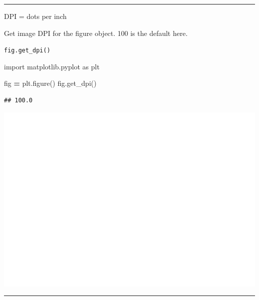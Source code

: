 \documentclass[
]{book}
\newenvironment{Shaded}{\begin{snugshade}}{\end{snugshade}}
\newcommand{\ImportTok}[1]{#1}
\newcommand{\NormalTok}[1]{#1}
\newcommand{\OperatorTok}[1]{\textcolor[rgb]{0.81,0.36,0.00}{\textbf{#1}}}
\theoremstyle{definition}
\theoremstyle{definition}
\theoremstyle{definition}
\theoremstyle{definition}
\theoremstyle{remark}
\begin{document}
\begin{center}\rule{0.5\linewidth}{0.5pt}\end{center}

DPI = dots per inch

Get image DPI for the figure object. 100 is the default here.

\texttt{fig.get\_dpi()}

\begin{Shaded}
\begin{Highlighting}[]
\ImportTok{import}\NormalTok{ matplotlib.pyplot }\ImportTok{as}\NormalTok{ plt}

\NormalTok{fig }\OperatorTok{=}\NormalTok{ plt.figure()}
\NormalTok{fig.get\_dpi()}
\end{Highlighting}
\end{Shaded}

\begin{verbatim}
## 100.0
\end{verbatim}

\includegraphics{202403181222-MatPlotLib_files/figure-latex/unnamed-chunk-23-25.pdf}

\begin{center}\rule{0.5\linewidth}{0.5pt}\end{center}
\end{document}
